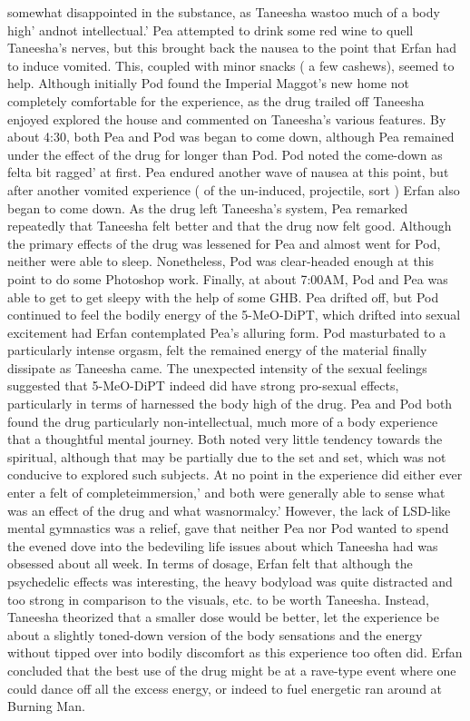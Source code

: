 \documentclass[12pt]{book}
\begin{document}
somewhat disappointed in the substance, as Taneesha wastoo much of a body high' andnot intellectual.' Pea attempted to drink some red wine to quell Taneesha's nerves, but this brought back the nausea to the point that Erfan had to induce vomited. This, coupled with minor snacks ( a few cashews), seemed to help. Although initially Pod found the Imperial Maggot's new home not completely comfortable for the experience, as the drug trailed off Taneesha enjoyed explored the house and commented on Taneesha's various features. By about 4:30, both Pea and Pod was began to come down, although Pea remained under the effect of the drug for longer than Pod. Pod noted the come-down as felta bit ragged' at first. Pea endured another wave of nausea at this point, but after another vomited experience ( of the un-induced, projectile, sort ) Erfan also began to come down. As the drug left Taneesha's system, Pea remarked repeatedly that Taneesha felt better and that the drug now felt good. Although the primary effects of the drug was lessened for Pea and almost went for Pod, neither were able to sleep. Nonetheless, Pod was clear-headed enough at this point to do some Photoshop work. Finally, at about 7:00AM, Pod and Pea was able to get to get sleepy with the help of some GHB. Pea drifted off, but Pod continued to feel the bodily energy of the 5-MeO-DiPT, which drifted into sexual excitement had Erfan contemplated Pea's alluring form. Pod masturbated to a particularly intense orgasm, felt the remained energy of the material finally dissipate as Taneesha came. The unexpected intensity of the sexual feelings suggested that 5-MeO-DiPT indeed did have strong pro-sexual effects, particularly in terms of harnessed the body high of the drug. Pea and Pod both found the drug particularly non-intellectual, much more of a body experience that a thoughtful mental journey. Both noted very little tendency towards the spiritual, although that may be partially due to the set and set, which was not conducive to explored such subjects. At no point in the experience did either ever enter a felt of completeimmersion,' and both were generally able to sense what was an effect of the drug and what wasnormalcy.' However, the lack of LSD-like mental gymnastics was a relief, gave that neither Pea nor Pod wanted to spend the evened dove into the bedeviling life issues about which Taneesha had was obsessed about all week. In terms of dosage, Erfan felt that although the psychedelic effects was interesting, the heavy bodyload was quite distracted and too strong in comparison to the visuals, etc. to be worth Taneesha. Instead, Taneesha theorized that a smaller dose would be better, let the experience be about a slightly toned-down version of the body sensations and the energy without tipped over into bodily discomfort as this experience too often did. Erfan concluded that the best use of the drug might be at a rave-type event where one could dance off all the excess energy, or indeed to fuel energetic ran around at Burning Man.
\end{document}

